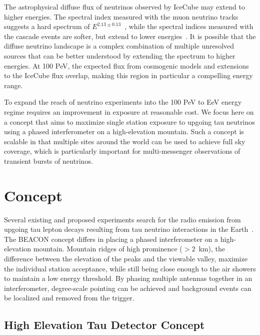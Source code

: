 \documentclass{PoS}
\begin{document}
The astrophysical diffuse flux of neutrinos observed by IceCube may extend to higher energies. The spectral index measured with the muon neutrino tracks suggests a hard spectrum of $E^{2.13\pm0.13}$~\cite{IceCube_muon}, while the spectral indices measured with the cascade events are softer, but extend to lower energies~\cite{HESE, combined}. It is possible that the diffuse neutrino landscape is a complex combination of multiple unresolved sources that can be better understood by extending the spectrum to higher energies. At 100 PeV, the expected flux from cosmogenic models and extensions to the IceCube flux overlap, making this region in particular a compelling energy range. 

To expand the reach of neutrino experiments into the 100 PeV to EeV energy regime requires an improvement in exposure at reasonable cost. We focus here on a concept that aims to maximize single station exposure to upgoing tau neutrinos using a phased interferometer on a high-elevation mountain. Such a concept is scalable in that multiple sites around the world can be used to achieve full sky coverage, which is particularly important for multi-messenger observations of transient bursts of neutrinos.

\section{Concept}
Several existing and proposed experiments search for the radio emission from  upgoing tau lepton decays resulting from tau neutrino interactions in the Earth~\cite{Auger, GRAND, Trinity, POEMMA}. The BEACON concept differs in placing a phased interferometer on a high-elevation mountain. Mountain ridges of high prominence ($>2$~km), the difference between the elevation of the peaks and the viewable valley, maximize the individual station acceptance, while still being close enough to the air showers to maintain a low energy threshold. By phasing multiple antennas together in an interferometer, degree-scale pointing can be achieved and background events can be localized and removed from the trigger.

\subsection{High Elevation Tau Detector Concept}
\end{document}
